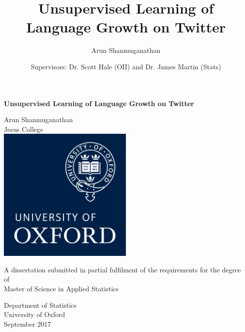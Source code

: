 \documentclass[12pt]{article}
\title{Unsupervised Learning of Language Growth on Twitter}
\author{Arun Shanmuganathan}
\date{Supervisors: Dr. Scott Hale (OII) and Dr. James Martin (Stats)}
\begin{document}
\begin{titlepage}
    \begin{center}
        \vspace*{0.5cm}
        
        \Huge
        \textbf{Unsupervised Learning of Language Growth on Twitter}
        \vspace{0.5cm}
        
\LARGE Arun Shanmuganathan\\
        Jesus College\\

        \vspace{1.2cm}
        \includegraphics[width=0.5\textwidth]{logo.png}        
        \vspace{0.8cm}
        
\normalsize A dissertation submitted in partial fulfilment of the requirements for the degree of \\ Master of Science in Applied Statistics\\


        
        \vspace{0.8cm}
        

        
        \large
        Department of Statistics\\
        University of Oxford\\
        September 2017
    \end{center}
\end{titlepage}


\end{document}
